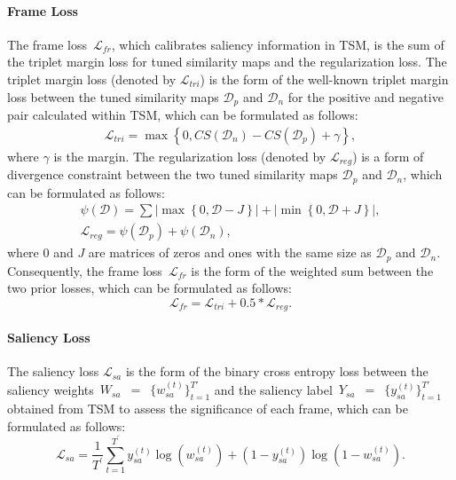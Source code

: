 \documentclass[10pt,twocolumn,letterpaper]{article}
\begin{document}
        \paragraph{Frame Loss \\}
        The frame loss~$\mathcal{L}_{fr}$, which calibrates saliency information in TSM, is the sum of the triplet margin loss for tuned similarity maps and the regularization loss. The triplet margin loss (denoted by $\mathcal{L}_{tri}$) is the form of the well-known triplet margin loss between the tuned similarity maps $\mathcal{D}_{p}$ and $\mathcal{D}_{n}$ for the positive and negative pair calculated within TSM, which can be formulated as follows:
        \begin{gather}
            \mathcal{L}_{tri} =\max \left\{ 0,CS\left( \mathcal{D}_{n}\right) -CS\left(\mathcal{D}_{p}\right) +\gamma \right\},
        \end{gather}
        where $\gamma$ is the margin. The regularization loss (denoted by $\mathcal{L}_{reg}$) is a form of divergence constraint between the two tuned similarity maps $\mathcal{D}_{p}$ and $\mathcal{D}_{n}$, which can be formulated as follows:
        \begin{gather}
            \psi (\mathcal{D}) = \sum{\left| \max \left\{ 0,\mathcal{D}-J\right\} \right| +\left| \min \left\{ 0,\mathcal{D}+J\right\} \right|}, \nonumber
            \\
            \mathcal{L}_{reg} = \psi (\mathcal{D}_{p}) + \psi (\mathcal{D}_{n}),
        \end{gather}
        where $0$ and $J$ are matrices of zeros and ones with the same size as $\mathcal{D}_{p}$ and $\mathcal{D}_{n}$. Consequently, the frame loss~$\mathcal{L}_{fr}$ is the form of the weighted sum between the two prior losses, which can be formulated as follows:
        \begin{equation}
            \mathcal{L}_{fr} = \mathcal{L}_{tri} + 0.5 * \mathcal{L}_{reg}.
        \end{equation}

        \paragraph{Saliency Loss \\}
        The saliency loss $\mathcal{L}_{sa}$ is the form of the binary cross entropy loss between the saliency weights~$W_{sa}$~$=$~$\{ w^{(t)}_{sa} \}^{T'}_{t=1}$ and the saliency label~$Y_{sa}$~$=$~$\{ y^{(t)}_{sa} \}^{T'}_{t=1}$ obtained from TSM to assess the significance of each frame, which can be formulated as follows:
        \begin{equation}
            \mathcal{L}_{sa}=\frac{1}{T^{\prime }} \sum^{T^{\prime }}_{t=1} y^{(t)}_{sa}\log(w^{(t)}_{sa})+(1-y^{(t)}_{sa})\log (1-w^{(t)}_{sa}).
        \end{equation}
\end{document}
